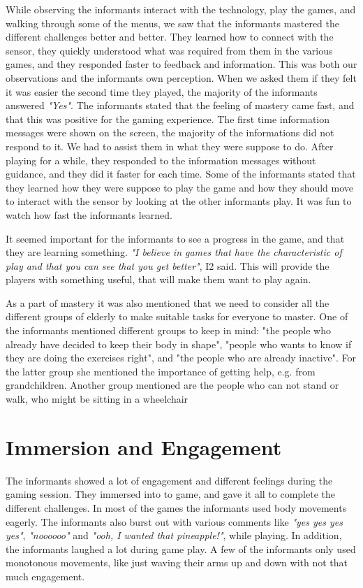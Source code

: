 While observing the informants interact with the technology, play the games, and walking through some of the menus, we saw that the informants mastered the different challenges better and better. They learned how to connect with the sensor, they quickly understood what was required from them in the various games, and they responded faster to feedback and information. This was both our observations and the informants own perception. When we asked them if they felt it was easier the second time they played, the majority of the informants answered \emph{"Yes"}. The informants stated that the feeling of mastery came fast, and that this was positive for the gaming experience. The first time information messages were shown on the screen, the majority of the informations did not respond to it. We had to assist them in what they were suppose to do. After playing for a while, they responded to the information messages without guidance, and they did it faster for each time. Some of the informants stated that they learned how they were suppose to play the game and how they should move to interact with the sensor by looking at the other informants play.  It was fun to watch how fast the informants learned.  

It seemed important for the informants to see a progress in the game, and that they are learning something. \emph{"I believe in games that have the characteristic of play and that you can see that you get better"}, I2 said. This will provide the players with something useful, that will make them want to play again.

As a part of mastery it was also mentioned that we need to consider all the different groups of elderly to make suitable tasks for everyone to master. One of the informants mentioned different groups to keep in mind: "the people who already have decided to keep their body in shape", "people who wants to know if they are doing the exercises right", and "the people who are already inactive". For the latter group she mentioned the importance of getting help, e.g. from grandchildren.  Another group mentioned are the people who can not stand or walk, who might be sitting in a wheelchair

\section{Immersion and Engagement}
The informants showed a lot of engagement and different feelings during the gaming session. They immersed into to game, and gave it all to complete the different challenges. In most of the games the informants used body movements eagerly. The informants also burst out with various comments like \emph{"yes yes yes yes"}, \emph{"noooooo"} and \emph{"ooh, I wanted that pineapple!"}, while playing. In addition, the informants laughed a lot during game play. A few of the informants only used monotonous movements, like just waving their arms up and down with not that much engagement.  

